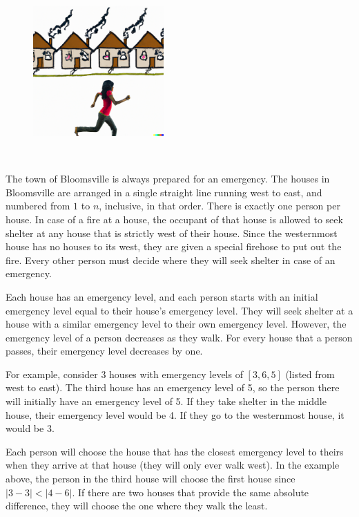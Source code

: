 
\begin{figure}
 \includegraphics[width=50mm]{img.png}
\end{figure}
~

The town of Bloomsville is always prepared for an emergency. The houses in Bloomsville are arranged in a single straight line running west to east, and numbered from $1$ to $n$, inclusive, in that order. There is exactly one person per house. In case of a fire at a house, the occupant of that house is allowed to seek shelter at any house that is strictly west of their house. Since the westernmost house has no houses to its west, they are given a special firehose to put out the fire. Every other person must decide where they will seek shelter in case of an emergency.

Each house has an emergency level, and each person starts with an initial emergency level equal to their house's emergency level. They will seek shelter at a house with a similar emergency level to their own emergency level. However, the emergency level of a person decreases as they walk. For every house that a person passes, their emergency level decreases by one.

For example, consider 3 houses with emergency levels of $[3, 6, 5]$ (listed from west to east). The third house has an emergency level of 5, so the person there will initially have an emergency level of 5. If they take shelter in the middle house, their emergency level would be 4. If they go to the westernmost house, it would be 3.

Each person will choose the house that has the closest emergency level to theirs when they arrive at that house (they will only ever walk west). In the example above, the person in the third house will choose the first house since $|3 - 3| < |4 - 6|$. If there are two houses that provide the same absolute difference, they will choose the one where they walk the least.

